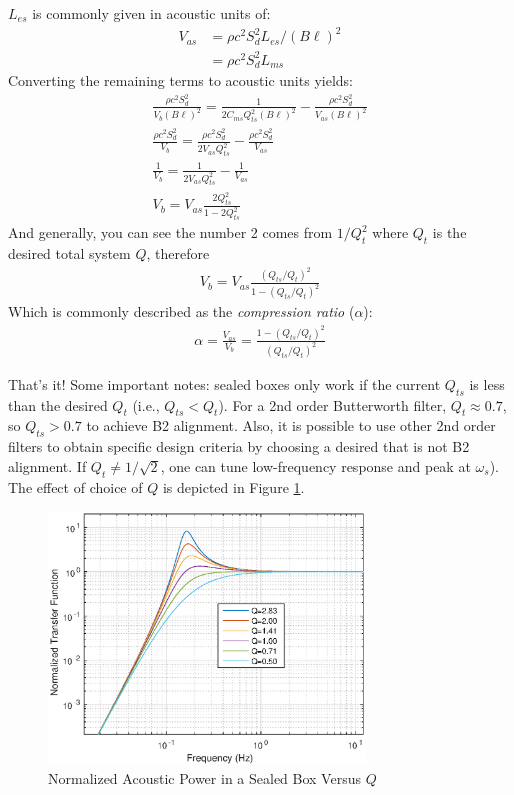 \documentclass[10pt]{book}
\begin{document}
$L_{es}$ is commonly given in acoustic units of:
\begin{align}
V_{as}&=\rho c^2 S_d^2 L_{es}/(B\ell)^2\\
&=\rho c^2 S_d^2 L_{ms}
\end{align}
Converting the remaining terms to acoustic units yields:
\begin{align}
\frac{\rho c^2 S_d^2}{V_{b} (B\ell)^2}=\frac{1}{2C_{ms}Q_{ts}^2(B\ell)^2}
-\frac{\rho c^2 S_d^2}{V_{as} (B\ell)^2}\\
\frac{\rho c^2 S_d^2}{V_{b}}=\frac{\rho c^2 S_d^2}{2V_{as}Q_{ts}^2}
-\frac{\rho c^2 S_d^2}{V_{as}}\\
\frac{1}{V_{b}}=\frac{1}{2V_{as}Q_{ts}^2}
-\frac{1}{V_{as}}\\
V_{b}=V_{as}\frac{2Q_{ts}^2}{1-2Q_{ts}^2}
\end{align}
And generally, you can see the number 2 comes from $1/Q_t^2$ where $Q_t$ is the desired total system $Q$, therefore
\begin{align}
V_{b}=V_{as}\frac{(Q_{ts}/Q_{t})^2}{1-(Q_{ts}/Q_{t})^2}
\end{align}
Which is commonly described as the \textit{compression ratio} ($\alpha$):
\begin{align}
\alpha=\frac{V_{as}}{V_b}=\frac{1-(Q_{ts}/Q_{t})^2}{(Q_{ts}/Q_{t})^2}
\end{align}

That's it! Some important notes: sealed boxes only work if the current $Q_{ts}$ is less than the desired $Q_t$ (i.e., $Q_{ts}<Q_{t}$). For a 2nd order Butterworth filter, $Q_t\approx 0.7$, so $Q_{ts}>0.7$ to achieve B2 alignment. Also, it is possible to use other 2nd order filters to obtain specific design criteria by choosing a desired that is not B2 alignment. If $Q_{t}\neq 1/\sqrt{2}$, one can tune  low-frequency response and peak at $\omega_s$). The effect of choice of $Q$ is depicted in Figure \ref{fig:sealedBoxQ}.

\begin{figure}
\centering
\includegraphics[width=0.75\textwidth]{matlab/sealedBoxQ.eps}
\caption{Normalized Acoustic Power in a Sealed Box Versus $Q$}\label{fig:sealedBoxQ}
\end{figure}
\end{document}
